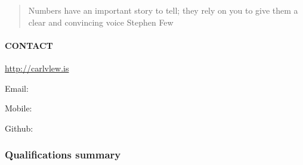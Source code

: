 \documentclass{article}
\begin{document}
\mdxtitleblockstart{}

\mdxtitleblockend%

\noindent{}

\begin{quote}%

\noindent{}Numbers have an important story to tell;
they rely on you to give them
a clear and convincing voice
\hspace*{1em}\hspace*{1em} \textemdash{} Stephen Few%
\end{quote}%

\mdhr{}%

\noindent{}%

\paragraph{CONTACT}\label{sec-contact}%

\noindent{}\href{http://carlvlew.is}{http://carlvlew.is}%

Email:%

Mobile:%

Github: %

\subsubsection{Qualifications summary}\label{sec-qualifications-summary}%
\end{document}
